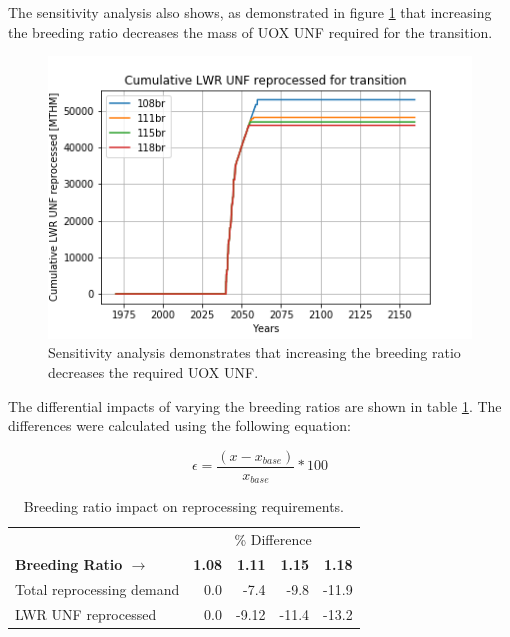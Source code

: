 The sensitivity analysis also shows, as demonstrated in figure \ref{fig:br_uox} that 
increasing the breeding ratio decreases the mass of \gls{UOX} \gls{UNF} 
required for the transition.

\begin{figure}[htbp!]
    \begin{center}
        \includegraphics[scale=0.6]{./images/sensitivity/br_uox_unf_cum.png}
    \end{center}
    \caption{Sensitivity analysis demonstrates that increasing the breeding 
    ratio decreases the required \gls{UOX} \gls{UNF}. }
    \label{fig:br_uox}
\end{figure}

The differential impacts of varying the breeding ratios are
shown in table \ref{tab:br_diff}. The differences were calculated
using the following equation:

\[ \epsilon = \frac{(x - x_{base})}{x_{base}} * 100 \]

\begin{table}[h]
	\centering
        \caption{Breeding ratio impact on reprocessing requirements.}
	\begin{tabular}{lrrrr}
		\hline
                & \multicolumn{4}{c}{\% Difference} \\
		\textbf{Breeding Ratio $\longrightarrow$}& \textbf{1.08}& \textbf{1.11} & \textbf{1.15} & \textbf{1.18} \\
		\hline
		Total reprocessing demand & 0.0 & -7.4 & -9.8 & -11.9 \\ 
		\gls{LWR} \gls{UNF} reprocessed & 0.0  & -9.12 & -11.4 & -13.2 \\
		\hline
	\end{tabular}
	\label{tab:br_diff}
\end{table}


